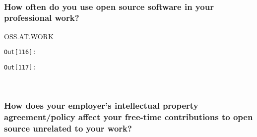 \documentclass[11pt]{article}
\begin{document}
    \begin{center}
    \end{center}
    { \hspace*{\fill} \\}
    
    \subsubsection{How often do you use open source software in your
professional
work?}\label{how-often-do-you-use-open-source-software-in-your-professional-work}

OSS.AT.WORK

\texttt{\color{outcolor}Out[{\color{outcolor}116}]:}
    

    

\texttt{\color{outcolor}Out[{\color{outcolor}117}]:}
    

    


    \begin{center}
    \end{center}
    { \hspace*{\fill} \\}
    
    \subsubsection{How does your employer's intellectual property
agreement/policy affect your free-time contributions to open source
unrelated to your
work?}\label{how-does-your-employers-intellectual-property-agreementpolicy-affect-your-free-time-contributions-to-open-source-unrelated-to-your-work}
\end{document}

